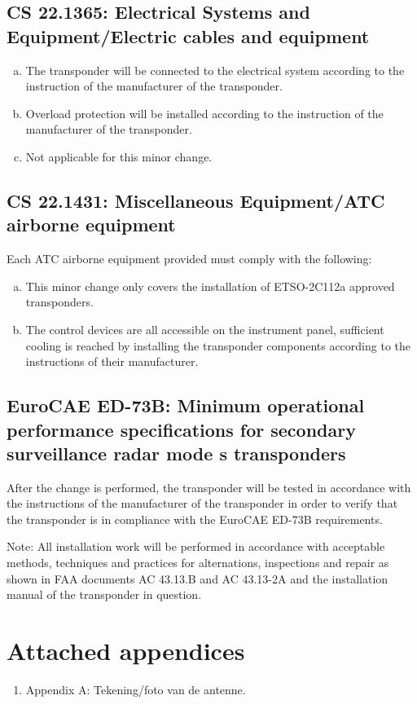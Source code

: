 \documentclass{article}
\begin{document}
\subsection{CS 22.1365:  Electrical Systems and Equipment/Electric cables and equipment}
\begin{enumerate}[(a)] 
\item The transponder will be connected to the electrical system according to the instruction of the manufacturer of the transponder.
\item Overload protection will be installed according to the instruction of
the manufacturer of the transponder.
\item Not applicable for this minor change.
\end{enumerate}

\subsection{CS 22.1431:  Miscellaneous Equipment/ATC airborne equipment}
Each ATC airborne equipment provided must comply with the following:
\begin{enumerate}[(a)]
\item This minor change only covers the installation of ETSO-2C112a approved transponders.
\item The control devices are all accessible on the instrument panel, sufficient cooling is reached by installing the transponder components according to the instructions of their manufacturer.
\end{enumerate}


\subsection{EuroCAE ED-73B: Minimum operational performance specifications for secondary surveillance radar mode s transponders}
After the change is performed, the transponder will be tested in accordance with the instructions of the manufacturer of the transponder in order to verify that the transponder is in compliance with the EuroCAE ED-73B requirements.


Note:
All installation work will be performed in accordance with acceptable methods, techniques and practices for alternations, inspections and repair as shown in FAA documents AC 43.13.B and AC 43.13-2A and the installation manual of the transponder in question.

\section{Attached appendices}
\begin{enumerate}
\item Appendix A: Tekening/foto van de antenne.
\end{enumerate}
\end{document}
